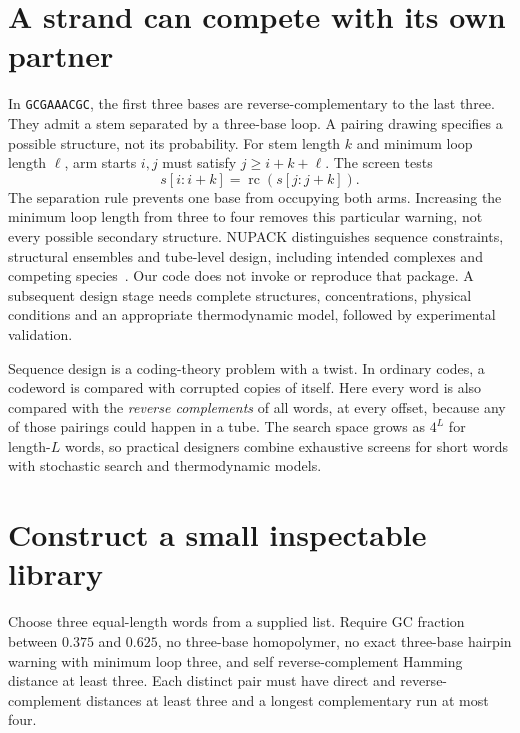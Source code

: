 \section{A strand can compete with its own partner}
In \texttt{GCGAAACGC}, the first three bases are reverse-complementary to the
last three. They admit a stem separated by a three-base loop. A pairing
drawing specifies a possible structure, not its probability.
For stem length $k$ and minimum loop length $\ell$, arm starts $i,j$ must
satisfy $j\ge i+k+\ell$. The screen tests
\begin{equation}
 s[i{:}i+k]=\operatorname{rc}(s[j{:}j+k]).
\end{equation}
The separation rule prevents one base from occupying both arms. Increasing
the minimum loop length from three to four removes this particular warning,
not every possible secondary structure.
NUPACK distinguishes sequence constraints, structural ensembles and tube-level
design, including intended complexes and competing species~\cite{NUPACKmodel}.
Our code does not invoke or reproduce that package. A subsequent design stage
needs complete structures, concentrations, physical conditions and an appropriate
thermodynamic model, followed by experimental validation.

\begin{CSBridge}
Sequence design is a coding-theory problem with a twist. In ordinary codes, a
codeword is compared with corrupted copies of itself. Here every word is also
compared with the \emph{reverse complements} of all words, at every offset,
because any of those pairings could happen in a tube. The search space grows
as $4^L$ for length-$L$ words, so practical designers combine exhaustive
screens for short words with stochastic search and thermodynamic models.
\end{CSBridge}

\section{Construct a small inspectable library}
Choose three equal-length words from a supplied list. Require GC fraction
between $0.375$ and $0.625$, no three-base homopolymer, no exact three-base
hairpin warning with minimum loop three, and self reverse-complement Hamming
distance at least three. Each distinct pair must have direct and
reverse-complement distances at least three and a longest complementary
run at most four.

